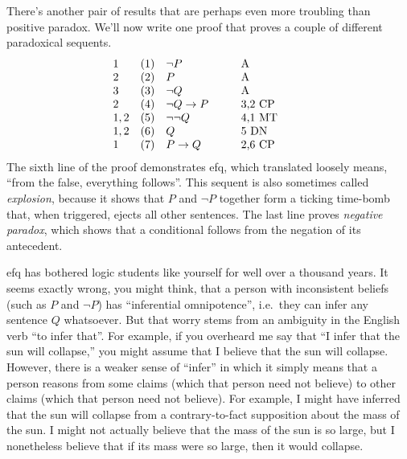 There's another pair of results that are perhaps even more troubling
than positive paradox.  We'll now write one proof that proves a couple
of different paradoxical sequents.   
\[ \begin{array}{l l >{$}p{2cm}<{$} p{2cm}}
     1 & (1) & \neg P      & A       \\
     2 & (2) & P           & A        \\
     3 & (3) & \neg Q      & A        \\
     2 & (4) & \neg Q\to P & 3,2 CP   \\
     1,2  & (5) & \neg \neg Q & 4,1 MT  \\
     1,2  & (6) & Q           & 5 DN     \\
     1 & (7) & P\to Q & 2,6 CP \end{array} \] The sixth line of
 the proof demonstrates \gls{efq}, which translated loosely means, ``from the false, everything follows''. This sequent is also sometimes called
 \emph{explosion}, because it shows that $P$ and $\neg P$ together
 form a ticking time-bomb that, when triggered, ejects all other
 sentences.  The last line proves \emph{negative paradox}, which shows
 that a conditional follows from the negation of its
 antecedent.

 \gls{efq} has bothered logic students like yourself for well over a
 thousand years.  It seems exactly wrong, you might think, that a
 person with inconsistent beliefs (such as $P$ and $\neg P$) has
 ``inferential omnipotence'', i.e.\ they can infer any sentence $Q$
 whatsoever.  But that worry stems from an ambiguity in the English
 verb ``to infer that''.  For example, if you overheard me say that
 ``I infer that the sun will collapse,'' you might assume that I
 believe that the sun will collapse.  However, there is a weaker sense
 of ``infer'' in which it simply means that a person reasons from some
 claims (which that person need not believe) to other claims (which
 that person need not believe).  For example, I might have inferred
 that the sun will collapse from a contrary-to-fact supposition about
 the mass of the sun.  I might not actually believe that the mass of
 the sun is so large, but I nonetheless believe that if its mass were
 so large, then it would collapse.
 
